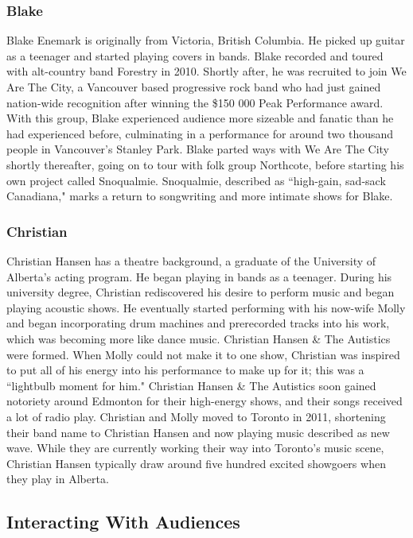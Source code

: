 \subsubsection{Blake}
Blake Enemark is originally from Victoria, British Columbia. He picked up guitar as a teenager and started playing covers in bands. Blake recorded and toured with alt-country band Forestry in 2010. Shortly after, he was recruited to join We Are The City, a Vancouver based progressive rock band who had just gained nation-wide recognition after winning the \$150 000 Peak Performance award. With this group, Blake experienced audience more sizeable and fanatic than he had experienced before, culminating in a performance for around two thousand people in Vancouver's Stanley Park. Blake parted ways with We Are The City shortly thereafter, going on to tour with folk group Northcote, before starting his own project called Snoqualmie. Snoqualmie, described as ``high-gain, sad-sack Canadiana," marks a return to songwriting and more intimate shows for Blake.

\subsubsection{Christian}
Christian Hansen has a theatre background, a graduate of the University of Alberta's acting program. He began playing in bands as a teenager. During his university degree, Christian rediscovered his desire to perform music and began playing acoustic shows. He eventually started performing with his now-wife Molly and began incorporating drum machines and prerecorded tracks into his work, which was becoming more like dance music. Christian Hansen \& The Autistics were formed. When Molly could not make it to one show, Christian was inspired to put all of his energy into his performance to make up for it; this was a ``lightbulb moment for him." Christian Hansen \& The Autistics soon gained notoriety around Edmonton for their high-energy shows, and their songs received a lot of radio play. Christian and Molly moved to Toronto in 2011, shortening their band name to Christian Hansen and now playing music described as new wave. While they are currently working their way into Toronto's music scene, Christian Hansen typically draw around five hundred excited showgoers when they play in Alberta.

\subsection{Interacting With Audiences}

